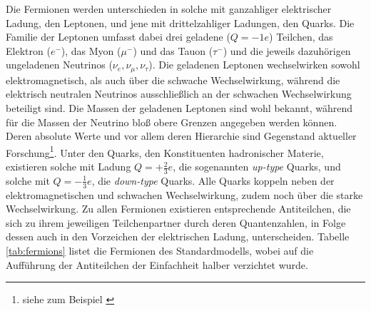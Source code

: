 Die Fermionen werden unterschieden in solche mit ganzahliger elektrischer
Ladung, den Leptonen, und jene mit drittelzahliger Ladungen, den Quarks. Die
Familie der Leptonen umfasst dabei drei geladene ($Q=-1e$) Teilchen, das
Elektron ($e^-$), das Myon ($\mu^-$) und das Tauon ($\tau^-$) und die jeweils
dazuhörigen ungeladenen Neutrinos ($\nu_e,\nu_\mu,\nu_\tau$). Die geladenen
Leptonen wechselwirken sowohl elektromagnetisch, als auch über die schwache
Wechselwirkung, während die elektrisch neutralen Neutrinos ausschließlich an
der schwachen Wechselwirkung beteiligt sind. Die Massen der geladenen Leptonen
sind wohl bekannt, während für die Massen der Neutrino bloß obere Grenzen
angegeben werden können. Deren absolute Werte und vor allem deren Hierarchie
sind Gegenstand aktueller Forschung\footnote{siehe zum Beispiel
\cite{Winter:2013ema}}. Unter den Quarks, den Konstituenten hadronischer
Materie, existieren solche mit Ladung $Q=+\tfrac{2}{3}e$, die sogenannten
\textit{up-type} Quarks, und solche mit $Q=-\tfrac{1}{3}e$, die
\textit{down-type} Quarks. Alle Quarks koppeln neben der elektromagnetischen
und schwachen Wechselwirkung, zudem noch über die starke Wechselwirkung.
Zu allen Fermionen existieren entsprechende Antiteilchen, die sich zu ihrem
jeweiligen Teilchenpartner durch deren Quantenzahlen, in Folge dessen auch in
den Vorzeichen der elektrischen Ladung, unterscheiden. Tabelle
\ref{tab:fermions} listet die Fermionen des Standardmodells, wobei auf die
Aufführung der Antiteilchen der Einfachheit halber verzichtet wurde.

